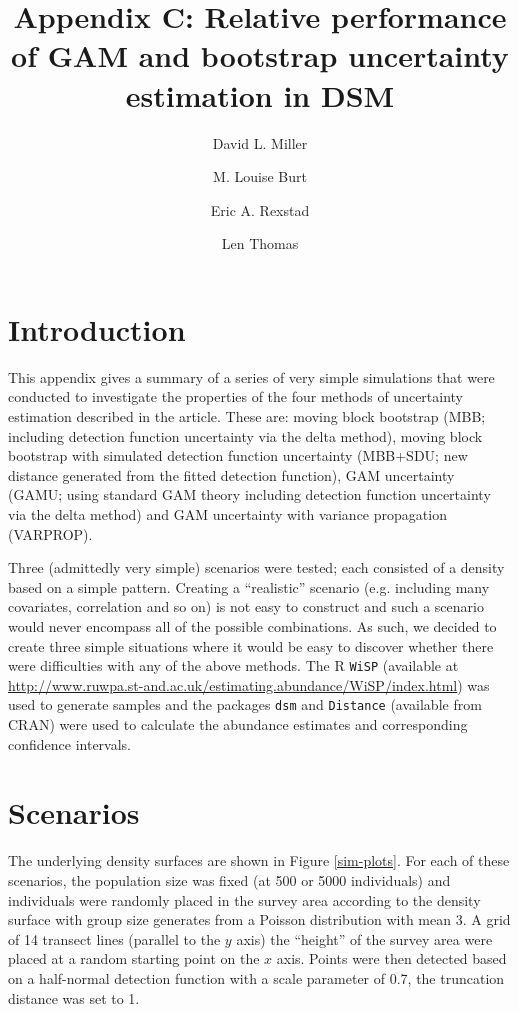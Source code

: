 \documentclass[11pt]{amsart}
\title{Appendix C: Relative performance of GAM and bootstrap uncertainty estimation in DSM}
\author{David L. Miller \and
M. Louise Burt \and
Eric A. Rexstad \and 
Len Thomas}
\begin{document}
\maketitle


\section{Introduction}

This appendix gives a summary of a series of very simple simulations that were conducted to investigate the properties of the four methods of uncertainty estimation described in the article. These are: moving block bootstrap (MBB; including detection function uncertainty via the delta method), moving block bootstrap with simulated detection function uncertainty (MBB+SDU; new distance generated from the fitted detection function), GAM uncertainty (GAMU; using standard GAM theory including detection function uncertainty via the delta method) and GAM uncertainty with variance propagation (VARPROP).

Three (admittedly very simple) scenarios were tested; each consisted of a density based on a simple pattern. Creating a ``realistic'' scenario (e.g. including many covariates, correlation and so on) is not easy to construct and such a scenario would never encompass all of the possible combinations. As such, we decided to create three simple situations where it would be easy to discover whether there were difficulties with any of the above methods. The \textsf{R} \texttt{WiSP} (available at \url{http://www.ruwpa.st-and.ac.uk/estimating.abundance/WiSP/index.html}) was used to generate samples and the packages \texttt{dsm} and \texttt{Distance} (available from CRAN) were used to calculate the abundance estimates and corresponding confidence intervals.

\section{Scenarios}

The underlying density surfaces are shown in Figure \ref{sim-plots}. For each of these scenarios, the population size was fixed (at 500 or 5000 individuals) and individuals were randomly placed in the survey area according to the density surface with group size generates from a Poisson distribution with mean 3. A grid of 14 transect lines (parallel to the $y$ axis) the ``height'' of the survey area were placed at a random starting point on the $x$ axis. Points were then detected based on a half-normal detection function with a scale parameter of 0.7, the truncation distance was set to 1.
\end{document}

